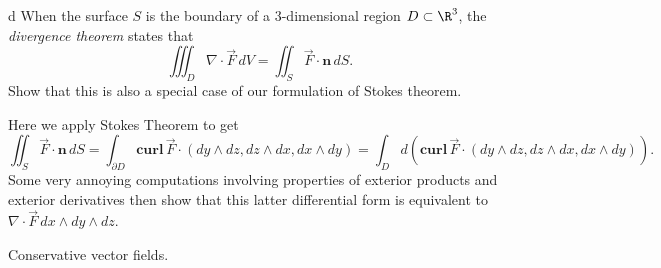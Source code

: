 \documentclass[11pt,letterpaper]{article}
\begin{document}
\begin{solution}
    \begin{partproblem}{d}
        When the surface $S$ is the boundary of a $3$-dimensional region $D\subset \R^3$, the \emph{divergence theorem} states that
        \[
            \iiint_D \nabla\cdot \vec{F}\,dV = \iint_S \vec{F}\cdot \mathbf{n}\,dS
        .\] 
        Show that this is also a special case of our formulation of Stokes theorem.
    \end{partproblem}
    \quad Here we apply Stokes Theorem to get
    \[
        \iint_S \vec{F}\cdot \mathbf{n}\,dS = \int_{\partial D} \textbf{curl}\, \vec{F}\cdot \left(dy\wedge dz, dz\wedge dx, dx\wedge dy\right) = \int_D d\left(\textbf{curl}\, \vec{F}\cdot \left(dy\wedge dz, dz\wedge dx, dx\wedge dy\right)\right)
    .\] 
    Some very annoying computations involving properties of exterior products and exterior derivatives then show that this latter differential form is equivalent to $\nabla\cdot \vec{F}\,dx\wedge dy\wedge dz$.
\end{solution}

\begin{cproblem}{2}
    Conservative vector fields.
\end{cproblem}
\end{document}
